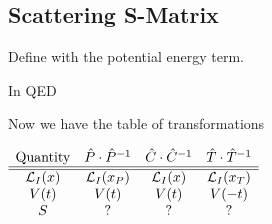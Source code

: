 \documentclass{article}
\begin{document}
\subsection{Scattering S-Matrix}
Define 
with 
the potential energy term. 
\begin{example}
In QED 
\end{example}
Now we have the table of transformations 
\begin{center}$
\begin{array}{cccc}
    \text{Quantity} & \hat{P}\cdot\hat{P}^{-1} & \hat{C}\cdot\hat{C}^{-1} & \hat{T}\cdot\hat{T}^{-1} \\
    \hline
    \hline
    \mathcal{L}_I(x) & \mathcal{L}_I(x_P) & \mathcal{L}_I(x) & \mathcal{L}_I(x_T) \\
    V(t) & V(t) & V(t) & V(-t) \\
    S & ? & ? & ? \\
\end{array}
$\end{center}
\end{document}
